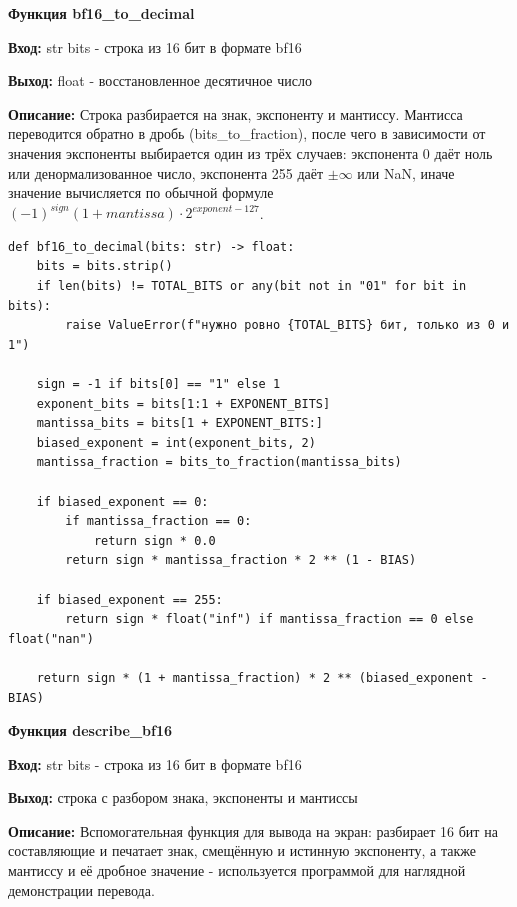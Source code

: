 \textbf{Функция bf16\_to\_decimal } \par
\textbf{Вход:} str bits - строка из 16 бит в формате bf16 \par
\textbf{Выход:} float - восстановленное десятичное число \par
\textbf{Описание:} Строка разбирается на знак, экспоненту и мантиссу. Мантисса переводится обратно в дробь (bits\_to\_fraction), после чего в зависимости от значения экспоненты выбирается один из трёх случаев: экспонента 0 даёт ноль или денормализованное число, экспонента 255 даёт $\pm\infty$ или NaN, иначе значение вычисляется по обычной формуле $(-1)^{sign}(1+mantissa) \cdot 2^{exponent-127}$.\par
\vspace{10pt}

\begin{lstlisting}[caption=bf16\_to\_decimal, label=lst:bf16-to-decimal]
def bf16_to_decimal(bits: str) -> float:
    bits = bits.strip()
    if len(bits) != TOTAL_BITS or any(bit not in "01" for bit in bits):
        raise ValueError(f"нужно ровно {TOTAL_BITS} бит, только из 0 и 1")

    sign = -1 if bits[0] == "1" else 1
    exponent_bits = bits[1:1 + EXPONENT_BITS]
    mantissa_bits = bits[1 + EXPONENT_BITS:]
    biased_exponent = int(exponent_bits, 2)
    mantissa_fraction = bits_to_fraction(mantissa_bits)

    if biased_exponent == 0:
        if mantissa_fraction == 0:
            return sign * 0.0
        return sign * mantissa_fraction * 2 ** (1 - BIAS)

    if biased_exponent == 255:
        return sign * float("inf") if mantissa_fraction == 0 else float("nan")

    return sign * (1 + mantissa_fraction) * 2 ** (biased_exponent - BIAS)
\end{lstlisting}

\textbf{Функция describe\_bf16 } \par
\textbf{Вход:} str bits - строка из 16 бит в формате bf16 \par
\textbf{Выход:} строка с разбором знака, экспоненты и мантиссы \par
\textbf{Описание:} Вспомогательная функция для вывода на экран: разбирает 16 бит на составляющие и печатает знак, смещённую и истинную экспоненту, а также мантиссу и её дробное значение - используется программой для наглядной демонстрации перевода.\par
\vspace{10pt}

